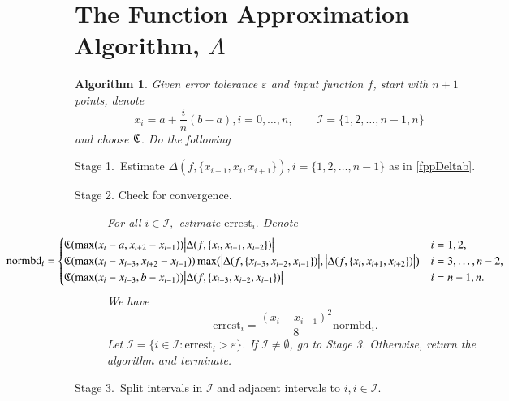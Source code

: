 \documentclass[review]{elsarticle}
\newtheorem{algo}{Algorithm}
\begin{document}
\section{The Function Approximation Algorithm, $A$} \label{sec:algo}

\begin{algo}
Given error tolerance $\varepsilon$ and input function $f$, start with $n+1$ points, denote
$$x_i=a+\frac{i}{n}(b-a), i=0,\ldots,n, \qquad \mathcal{I} = \{1,2,\ldots,n-1,n\}$$ and choose $\mathfrak{C}$. Do the following
\begin{description}
\item[Stage 1.\ Estimate $\Delta(f,\{x_{i-1}, x_{i}, x_{i+1}\}), i = \{1,2,\ldots,n-1\}$ as in \eqref{fppDeltab}.] \label{stage1}
\item[Stage 2. Check for convergence.]  \label{stage2}
For all $ i \in \mathcal{I},$ estimate $\text{errest}_i.$
Denote\[\hspace{-20ex}
\text{normbd}_i=\begin{cases}
\fC(\max(x_i-a,x_{i+2}-x_{i-1}))\bigabs{\Delta(f,\{x_{i}, x_{i+1}, x_{i+2}\})}        &  i=1,2, \\
\fC(\max(x_i-x_{i-3},x_{i+2}-x_{i-1}))\max\bigl(\bigabs{\Delta(f,\{x_{i-3}, x_{i-2}, x_{i-1}\})},\bigabs{\Delta(f,\{x_{i}, x_{i+1}, x_{i+2}\})}\bigr)  & i =3, \ldots, n-2,\\
\fC(\max(x_i-x_{i-3},b-x_{i-1}))\bigabs{\Delta(f,\{x_{i-3}, x_{i-2}, x_{i-1}\})}  & i=n-1,n.\\
\end{cases}
\]
We have
\[
\text{errest}_i=
\frac{(x_i-x_{i-1})^2}{8}\text{normbd}_i.
\]
Let $ \mathcal{I} = \{i \in \mathcal{I}: \text{errest}_i > \varepsilon\}$.
If $\mathcal{I} \ne \emptyset$, go to Stage 3.
Otherwise, return the algorithm and terminate.
\item[Stage 3.\ Split intervals in $\mathcal{I}$ and adjacent intervals to $i, i \in \mathcal{I}$.]\label{stage3} %

\end{description}
\end{algo}
\end{document}
